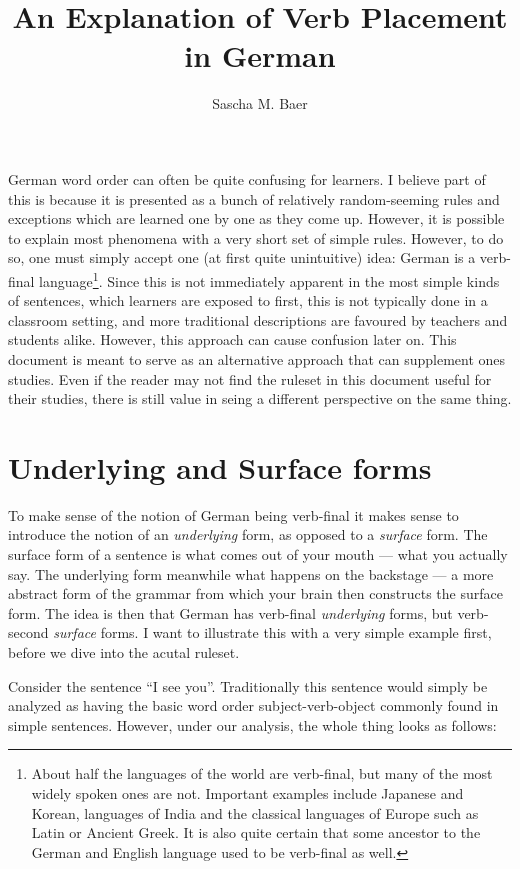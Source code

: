 \documentclass[12pt, a4paper]{scrartcl}
\author{Sascha M. Baer}
\title{An Explanation of Verb Placement in German}
\newcommand{\en}[1]{``#1''}		%
\newcommand{\de}[1]{\hspace{0pt}{\color{teal}#1}} %
\begin{document}
\maketitle

German word order can often be quite confusing for learners. I believe part of this is because it is presented as a bunch of relatively random-seeming rules and exceptions which are learned one by one as they come up. However, it is possible to explain most phenomena with a very short set of simple rules. However, to do so, one must simply accept one (at first quite unintuitive) idea: German is a verb-final language\footnote{About half the languages of the world are verb-final, but many of the most widely spoken ones are not. Important examples include Japanese and Korean, languages of India and the classical languages of Europe such as Latin or Ancient Greek. It is also quite certain that some ancestor to the German and English language used to be verb-final as well.}. Since this is not immediately apparent in the most simple kinds of sentences, which learners are exposed to first, this is not typically done in a classroom setting, and more traditional descriptions are favoured by teachers and students alike. However, this approach can cause confusion later on. This document is meant to serve as an alternative approach that can supplement ones studies. Even if the reader may not find the ruleset in this document useful for their studies, there is still value in seing a different perspective on the same thing.

\section{Underlying and Surface forms}
To make sense of the notion of German being verb-final it makes sense to introduce the notion of an \emph{underlying} form, as opposed to a \emph{surface} form. The surface form of a sentence is what comes out of your mouth --- what you actually say. The underlying form meanwhile what happens on the backstage --- a more abstract form of the grammar from which your brain then constructs the surface form. The idea is then that German has verb-final \emph{underlying} forms, but verb-second \emph{surface} forms. I want to illustrate this with a very simple example first, before we dive into the acutal ruleset. 

Consider the sentence \de{Ich sehe dich.} \en{I see you}. Traditionally this sentence would simply be analyzed as having the basic word order subject-verb-object commonly found in simple sentences. However, under our analysis, the whole thing looks as follows:
\end{document}
